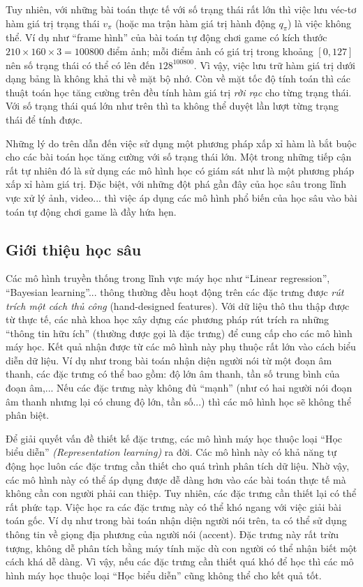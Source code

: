 	Tuy nhiên, với những bài toán thực tế với số trạng thái rất lớn thì việc lưu véc-tơ hàm giá trị trạng thái $v_{\pi}$ (hoặc ma trận hàm giá trị hành động $q_{\pi}$) là việc không thể. 
	Ví dụ như ``frame hình'' của bài toán tự động chơi game có kích thước $210\times160\times3=100800$ điểm ảnh; mỗi điểm ảnh có giá trị trong khoảng $[0, 127]$ nên số trạng thái có thể có lên đến $128^{100800}$.
	Vì vậy, việc lưu trữ hàm giá trị dưới dạng bảng là không khả thi về mặt bộ nhớ.
	Còn về mặt tốc độ tính toán thì các thuật toán học tăng cường trên đều tính hàm giá trị \textit{rời rạc} cho từng trạng thái.
	Với số trạng thái quá lớn như trên thì ta không thể duyệt lần lượt từng trạng thái để tính được.
	
	Những lý do trên dẫn đến việc sử dụng một phương pháp xấp xỉ hàm là bắt buộc cho các bài toán học tăng cường với số trạng thái lớn.
	Một trong những tiếp cận rất tự nhiên đó là sử dụng các mô hình học có giám sát như là một phương pháp xấp xỉ hàm giá trị.
	Đặc biệt, với những đột phá gần đây của học sâu trong lĩnh vực xử lý ảnh, video... thì việc áp dụng các mô hình phổ biến của học sâu vào bài toán tự động chơi game là đầy hứa hẹn.
	
\subsection{Giới thiệu học sâu}
	Các mô hình truyền thống trong lĩnh vực máy học như ``Linear regression'', ``Bayesian learning''... thông thường đều hoạt động trên các đặc trưng được \textit{rút trích một cách thủ công} (hand-designed features).
	Với dữ liệu thô thu thập được từ thực tế, các nhà khoa học xây dựng các phương pháp rút trích ra những ``thông tin hữu ích'' (thường được gọi là đặc trưng) để cung cấp cho các mô hình máy học.
	Kết quả nhận được từ các mô hình này phụ thuộc rất lớn vào cách biểu diễn dữ liệu.
	Ví dụ như trong bài toán nhận diện người nói từ một đoạn âm thanh, các đặc trưng có thể bao gồm: độ lớn âm thanh, tần số trung bình của đoạn âm,...
	Nếu các đặc trưng này không đủ ``mạnh'' (như có hai người nói đoạn âm thanh nhưng lại có chung độ lớn, tần số...) thì các mô hình học sẽ không thể phân biệt.
		
	Để giải quyết vấn đề thiết kế đặc trưng, các mô hình máy học thuộc loại ``Học biểu diễn'' \textit{(Representation learning)} ra đời.
	Các mô hình này có khả năng tự động học luôn các đặc trưng cần thiết cho quá trình phân tích dữ liệu.
	Nhờ vậy, các mô hình này có thể áp dụng được dễ dàng hơn vào các bài toán thực tế mà không cần con người phải can thiệp.
	Tuy nhiên, các đặc trưng cần thiết lại có thể rất phức tạp.
	Việc học ra các đặc trưng này có thể khó ngang với việc giải bài toán gốc.
	Ví dụ như trong bài toán nhận diện người nói trên, ta có thể sử dụng thông tin về giọng địa phương của người nói (accent).
	Đặc trưng này rất trừu tượng, không dễ phân tích bằng máy tính mặc dù con người có thể nhận biết một cách khá dễ dàng.
	Vì vậy, nếu các đặc trưng cần thiết quá khó để học thì các mô hình máy học thuộc loại ``Học biểu diễn'' cũng không thể cho kết quả tốt.

